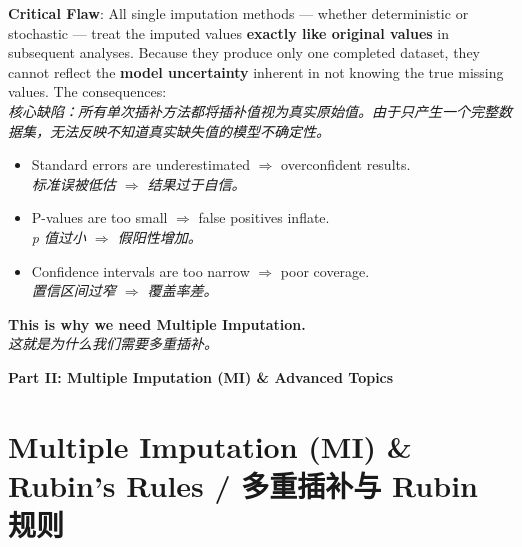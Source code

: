 \documentclass[9pt, a4paper]{article}
\begin{document}
\begin{tcolorbox}[summarybox]
    \textbf{Critical Flaw}: All single imputation methods --- whether deterministic or stochastic --- treat the imputed values \textbf{exactly like original values} in subsequent analyses. Because they produce only one completed dataset, they cannot reflect the \textbf{model uncertainty} inherent in not knowing the true missing values. The consequences:\\
    \textit{核心缺陷：所有单次插补方法都将插补值视为真实原始值。由于只产生一个完整数据集，无法反映不知道真实缺失值的模型不确定性。}
    \begin{itemize}
        \item Standard errors are underestimated $\Rightarrow$ overconfident results.\\
        \textit{标准误被低估 $\Rightarrow$ 结果过于自信。}
        \item P-values are too small $\Rightarrow$ false positives inflate.\\
        \textit{p 值过小 $\Rightarrow$ 假阳性增加。}
        \item Confidence intervals are too narrow $\Rightarrow$ poor coverage.\\
        \textit{置信区间过窄 $\Rightarrow$ 覆盖率差。}
    \end{itemize}
    \textbf{This is why we need Multiple Imputation.}\\
    \textit{这就是为什么我们需要多重插补。}
\end{tcolorbox}
\begin{center}
    \Large \textbf{Part II: Multiple Imputation (MI) \& Advanced Topics}
\end{center}

\section{Multiple Imputation (MI) \& Rubin's Rules / 多重插补与 Rubin 规则}
\end{document}

